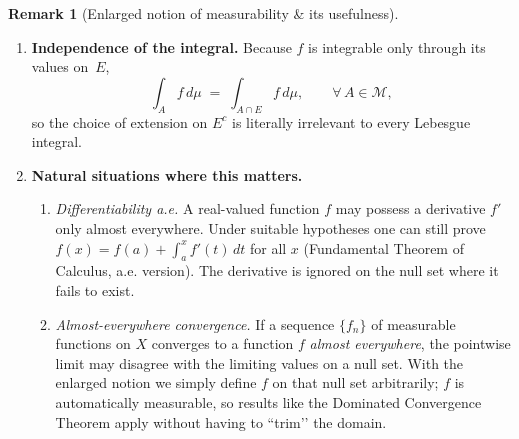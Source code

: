 \documentclass[12pt]{article}
\theoremstyle{definition} %
\newtheorem{remark}{Remark}
\theoremstyle{plain} %
\begin{document}
\begin{remark}[Enlarged notion of measurability \& its usefulness]
\begin{enumerate}
      \item \textbf{Independence of the integral.}  
            Because \(f\) is integrable only through its values on~\(E\),
            \[
                \int_{A}f\,d\mu
                \;=\;
                \int_{A\cap E}f\,d\mu,
                \qquad
                \forall\,A\in\mathcal{M},
            \]
            so the choice of extension on \(E^{c}\) is literally irrelevant
            to every Lebesgue integral.

      \item \textbf{Natural situations where this matters.}
            \begin{enumerate}[]
                \item \emph{Differentiability a.e.}  
                      A real-valued function \(f\) may possess a derivative 
                      \(f'\) only almost everywhere.  
                      Under suitable hypotheses one can still prove
                      \(f(x)=f(a)+\displaystyle\int_{a}^{x}f'(t)\,dt\)
                      for all \(x\) (Fundamental Theorem of Calculus, a.e. version).
                      The derivative is ignored on the null set
                      where it fails to exist.
                \item \emph{Almost-everywhere convergence.}  
                      If a sequence \(\{f_n\}\) of measurable functions on \(X\) 
                      converges to a function \(f\) \emph{almost everywhere},
                      the pointwise limit may disagree with the limiting values
                      on a null set.  
                      With the enlarged notion we simply define \(f\) on that null
                      set arbitrarily; \(f\) is automatically measurable, so
                      results like the Dominated Convergence Theorem apply
                      without having to ``trim’’ the domain.
            \end{enumerate}
  \end{enumerate}
\end{remark}
\pagebreak
\end{document}
